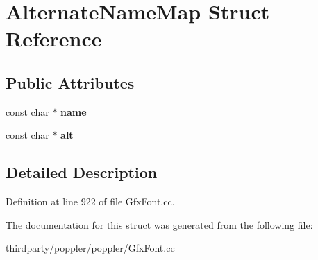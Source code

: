 \hypertarget{struct_alternate_name_map}{}\section{Alternate\+Name\+Map Struct Reference}
\label{struct_alternate_name_map}
\subsection*{Public Attributes}
\begin{DoxyCompactItemize}
\item 
\mbox{\label{struct_alternate_name_map_ac878b21e783d67b18c93e76fc5a23bfc}} 
const char $\ast$ {\bfseries name}
\item 
\mbox{\label{struct_alternate_name_map_addfc61e3e91e4953b686cee02da139dd}} 
const char $\ast$ {\bfseries alt}
\end{DoxyCompactItemize}


\subsection{Detailed Description}


Definition at line 922 of file Gfx\+Font.\+cc.



The documentation for this struct was generated from the following file\+:\begin{DoxyCompactItemize}
\item 
thirdparty/poppler/poppler/Gfx\+Font.\+cc\end{DoxyCompactItemize}
